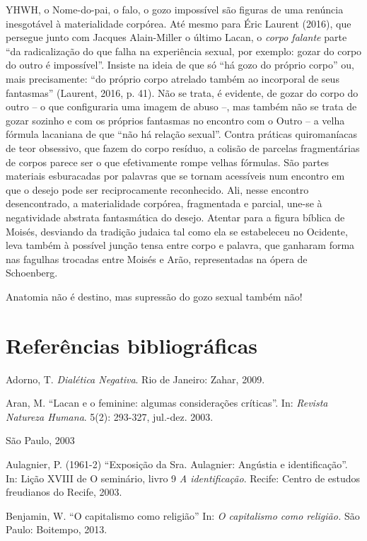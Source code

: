 YHWH, o Nome-do-pai, o falo, o gozo impossível são figuras de uma
renúncia inesgotável à materialidade corpórea. Até mesmo para Éric
Laurent (2016), que persegue junto com Jacques Alain-Miller o último
Lacan, o \emph{corpo falante} parte ``da radicalização do que falha na
experiência sexual, por exemplo: gozar do corpo do outro é impossível''.
Insiste na ideia de que só ``há gozo do próprio corpo'' ou, mais
precisamente: ``do próprio corpo atrelado também ao incorporal de seus
fantasmas'' (Laurent, 2016, p. 41). Não se trata, é evidente, de gozar
do corpo do outro -- o que configuraria uma imagem de abuso --, mas
também não se trata de gozar sozinho e com os próprios fantasmas no
encontro com o Outro -- a velha fórmula lacaniana de que ``não há
relação sexual''. Contra práticas quiromaníacas de teor obsessivo, que
fazem do corpo resíduo, a colisão de parcelas fragmentárias de corpos
parece ser o que efetivamente rompe velhas fórmulas. São partes
materiais esburacadas por palavras que se tornam acessíveis num encontro
em que o desejo pode ser reciprocamente reconhecido. Ali, nesse encontro
desencontrado, a materialidade corpórea, fragmentada e parcial, une-se à
negatividade abstrata fantasmática do desejo. Atentar para a figura
bíblica de Moisés, desviando da tradição judaica tal como ela se
estabeleceu no Ocidente, leva também à possível junção tensa entre corpo
e palavra, que ganharam forma nas fagulhas trocadas entre Moisés e Arão,
representadas na ópera de Schoenberg.

Anatomia não é destino, mas supressão do gozo sexual também não!

\section{Referências bibliográficas}

Adorno, T. \emph{Dialética Negativa}. Rio de Janeiro: Zahar, 2009.

Aran, M. ``Lacan e o feminine: algumas considerações críticas''. In:
\emph{Revista Natureza Humana}. 5(2): 293-327, jul.-dez. 2003.

São Paulo, 2003

Aulagnier, P. (1961-2) ``Exposição da Sra. Aulagnier: Angústia e
identificação''. In: Lição XVIII de O seminário, livro 9 \emph{A
identificação}. Recife: Centro de estudos freudianos do Recife, 2003.

Benjamin, W. ``O capitalismo como religião'' In: \emph{O capitalismo
como religião.} São Paulo: Boitempo, 2013.

